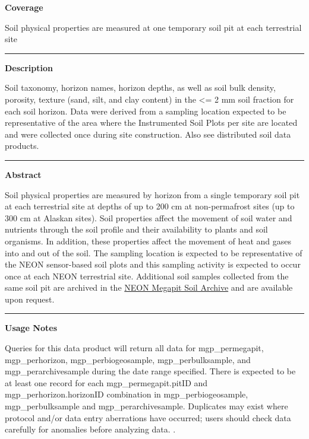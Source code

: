\documentclass[]{article}
\begin{document}
\textbf{Coverage}

Soil physical properties are measured at one temporary soil pit at each
terrestrial site

\begin{center}\rule{0.5\linewidth}{\linethickness}\end{center}

\textbf{Description}

Soil taxonomy, horizon names, horizon depths, as well as soil bulk
density, porosity, texture (sand, silt, and clay content) in the
\textless{}= 2 mm soil fraction for each soil horizon. Data were derived
from a sampling location expected to be representative of the area where
the Instrumented Soil Plots per site are located and were collected once
during site construction. Also see distributed soil data products.

\begin{center}\rule{0.5\linewidth}{\linethickness}\end{center}

\textbf{Abstract}

Soil physical properties are measured by horizon from a single temporary
soil pit at each terrestrial site at depths of up to 200 cm at
non-permafrost sites (up to 300 cm at Alaskan sites). Soil properties
affect the movement of soil water and nutrients through the soil profile
and their availability to plants and soil organisms. In addition, these
properties affect the movement of heat and gases into and out of the
soil. The sampling location is expected to be representative of the NEON
sensor-based soil plots and this sampling activity is expected to occur
once at each NEON terrestrial site. Additional soil samples collected
from the same soil pit are archived in the
\href{http://www.neonscience.org/request-megapit-soil-samples}{NEON
Megapit Soil Archive} and are available upon request.

\begin{center}\rule{0.5\linewidth}{\linethickness}\end{center}

\textbf{Usage Notes}

Queries for this data product will return all data for mgp\_permegapit,
mgp\_perhorizon, mgp\_perbiogeosample, mgp\_perbulksample, and
mgp\_perarchivesample during the date range specified. There is expected
to be at least one record for each mgp\_permegapit.pitID and
mgp\_perhorizon.horizonID combination in mgp\_perbiogeosample,
mgp\_perbulksample and mgp\_perarchivesample. Duplicates may exist where
protocol and/or data entry aberrations have occurred; users should check
data carefully for anomalies before analyzing data. \newpage
.
\end{document}
